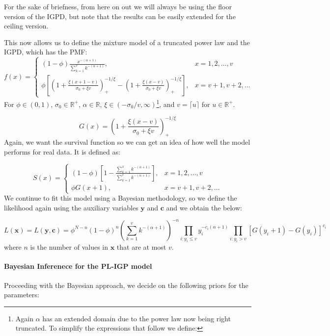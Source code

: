 \documentclass[
]{article}
\let\oldparagraph\paragraph
\renewcommand{\paragraph}[1]{\oldparagraph{#1}\mbox{}}
\begin{document}
For the sake of briefness, from here on out we will always be using the
floor version of the IGPD, but note that the results can be easily
extended for the ceiling version.

This now allows us to define the mixture model of a truncated power law
and the IGPD, which has the PMF: \[
f(x) = 
\begin{cases}
(1-\phi)\frac{x^{-(\alpha+1)}}{\sum_{k=1}^v k^{-(\alpha+1)}},&x=1,2,\ldots,v\\
\phi\left[\left(1+\frac{\xi(x+1-v)}{\sigma_0 + \xi v}\right)_+^{-1/\xi} - \left(1+\frac{\xi(x-v)}{\sigma_0 + \xi v}\right)_+^{-1/\xi}\right], &x=v+1, v+2, \ldots
\end{cases}
\] For \(\phi\in(0,1)\), \(\sigma_0 \in \mathbb{R}^+\),
\(\alpha\in\mathbb{R}\), \(\xi \in (-\sigma_0/v, \infty)\)\footnote{Again
  \(\alpha\) has an extended domain due to the power law now being right
  truncated. To simplify the expressions that follow we define:}, and
\(v=\lceil u \rceil\) for \(u \in \mathbb{R}^+\).

\[
G(x) = \left(1+\frac{\xi(x-v)}{\sigma_0 + \xi v}\right)_+^{-1/\xi}
\] Again, we want the survival function so we can get an idea of how
well the model performs for real data. It is defined as:

\[
S(x) = \begin{cases}
(1-\phi)\left[1-\frac{\sum_{k=1}^xk^{-(\alpha+1)}}{\sum_{k=1}^v k^{-(\alpha+1)}}\right], &x=1,2,\ldots,v\\
\phi G(x+1),&x=v+1,v+2, \ldots
\end{cases}
\] We continue to fit this model using a Bayesian methodology, so we
define the likelihood again using the auxiliary variables
\(\boldsymbol{y}\) and \(\boldsymbol{c}\) and we obtain the below:

\[
L(\boldsymbol{x}) = L(\boldsymbol{y}, \boldsymbol{c}) = \phi^{N-n}(1-\phi)^n \left(\sum_{k=1}^v k^{-(\alpha+1)}\right)^{-n}\prod_{i:y_i\le v}y_i^{-c_i(\alpha+1)}\prod_{i:y_i>v}\left[G(y_i+1) - G(y_i)\right]^{c_i}
\] where \(n\) is the number of values in \(\boldsymbol{x}\) that are at
most \(v\).

\paragraph{Bayesian Inferenece for the PL-IGP
model}\label{bayesian-inferenece-for-the-pl-igp-model}

Proceeding with the Bayesian approach, we decide on the following priors
for the parameters:
\end{document}
